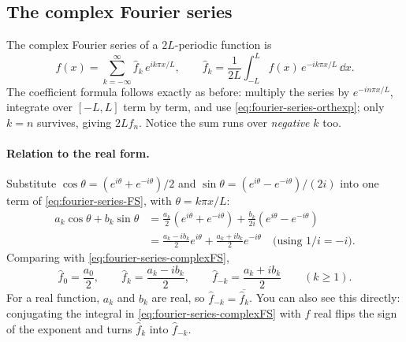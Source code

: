 \subsection{The complex Fourier series}

The complex Fourier series of a $2L$-periodic function is
\begin{equation}
f(x)=\sum_{k=-\infty}^{\infty}\hat f_k\,e^{ik\pi x/L},\qquad
\hat f_k=\frac1{2L}\int_{-L}^{L}f(x)\,e^{-ik\pi x/L}\,\dd x .
\label{eq:fourier-series-complexFS}
\end{equation}
The coefficient formula follows exactly as before: multiply the series by $e^{-in\pi x/L}$, integrate over $[-L,L]$ term by term, and use \cref{eq:fourier-series-orthexp}; only $k=n$ survives, giving $2L\hat f_n$. Notice the sum runs over \emph{negative} $k$ too.

\paragraph{Relation to the real form.} Substitute $\cos\theta=(e^{i\theta}+e^{-i\theta})/2$ and $\sin\theta=(e^{i\theta}-e^{-i\theta})/(2i)$ into one term of \cref{eq:fourier-series-FS}, with $\theta=k\pi x/L$:
\begin{align}
a_k\cos\theta+b_k\sin\theta&=\frac{a_k}{2}(e^{i\theta}+e^{-i\theta})+\frac{b_k}{2i}(e^{i\theta}-e^{-i\theta})\\
&=\frac{a_k-ib_k}{2}e^{i\theta}+\frac{a_k+ib_k}{2}e^{-i\theta}\quad\text{(using $1/i=-i$)}.
\end{align}
Comparing with \cref{eq:fourier-series-complexFS},
\begin{equation}
\hat f_0=\frac{a_0}{2},\qquad \hat f_k=\frac{a_k-ib_k}{2},\qquad \hat f_{-k}=\frac{a_k+ib_k}{2}\qquad(k\ge1).
\label{eq:fourier-series-realcomplex}
\end{equation}
For a real function, $a_k$ and $b_k$ are real, so $\hat f_{-k}=\overline{\hat f_k}$. You can also see this directly: conjugating the integral in \cref{eq:fourier-series-complexFS} with $f$ real flips the sign of the exponent and turns $\hat f_k$ into $\hat f_{-k}$.


